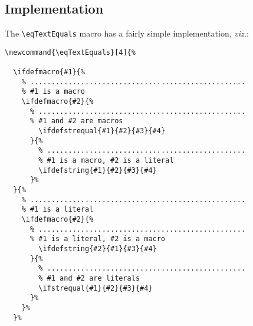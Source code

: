 \documentclass[a5paper,10pt,german]{article}
\begin{document}
\newpage
\subsection*{Implementation}

The \verb#\eqTextEquals# macro has a fairly simple implementation, {\em viz.}:

\begin{verbatim}
\newcommand{\eqTextEquals}[4]{%

  \ifdefmacro{#1}{%
    % ...................................................
    % #1 is a macro
    \ifdefmacro{#2}{%
      % .................................................
      % #1 and #2 are macros
        \ifdefstrequal{#1}{#2}{#3}{#4}
      }{%
        % ...............................................
        % #1 is a macro, #2 is a literal
        \ifdefstring{#1}{#2}{#3}{#4}
      }%
  }{%
    % ...................................................
    % #1 is a literal
    \ifdefmacro{#2}{%
      % .................................................
      % #1 is a literal, #2 is a macro
        \ifdefstring{#2}{#1}{#3}{#4}
      }{%
        % ...............................................
        % #1 and #2 are literals
        \ifstrequal{#1}{#2}{#3}{#4}
      }%
    }%
  }%
\end{verbatim}
\end{document}
